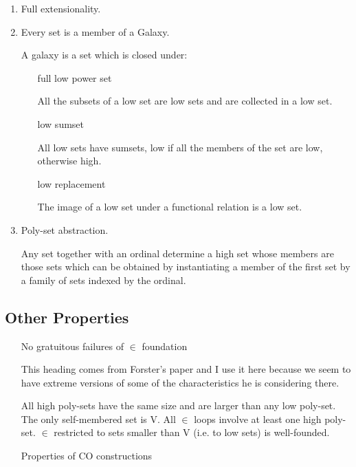 \documentclass[numreferences]{rbjk}
\begin{document}
\begin{article}
\begin{enumerate}
\item Full extensionality.

\item Every set is a member of a Galaxy.

A galaxy is a set which is closed under:

\begin{itemize}
\item [full low power set]\ 

All the subsets of a low set are low sets and are collected in a low set.

\item [low sumset]\ 

All low sets have sumsets, low if all the members of the set are low, otherwise high.

\item [low replacement]\ 

The image of a low set under a functional relation is a low set.

\end{itemize}

\item Poly-set abstraction.

Any set together with an ordinal determine a high set whose members are those sets which can be obtained by instantiating a member of the first set by a family of sets indexed by the ordinal.

\end{enumerate}

\subsection{Other Properties}

\begin{itemize}

\item[No gratuitous failures of $\in$ foundation]\ 

This heading comes from Forster's paper \cite{forster2006} and I use it here because we seem to have extreme versions of some of the characteristics he is considering there.

All high poly-sets have the same size and are larger than any low poly-set.
The only self-membered set is V.
All $\in$ loops involve at least one high poly-set.
$\in$ restricted to sets smaller than V (i.e. to low sets) is well-founded.

\item[Properties of CO constructions]\ 


\end{itemize}
\end{article}
\end{document}

